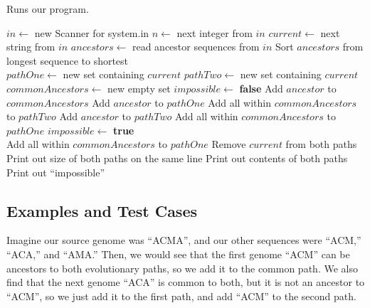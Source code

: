 \documentclass[12pt]{article}
\begin{document}
\begin{algorithm}[H]
\caption{Runs our program.}
\begin{algorithmic}
    \State $in \gets$ new Scanner for system.in
        \State $n \gets$ next integer from $in$
        \State $current \gets$ next string from $in$
        \State $ancestors \gets$ read ancestor sequences from $in$
        \State Sort $ancestors$ from longest sequence to shortest
        \\
        \State $pathOne \gets$ new set containing $current$
        \State $pathTwo \gets$ new set containing $current$
        \State $commonAncestors \gets$ new empty set
        \State $impossible \gets$ {\bf false}
                \State Add $ancestor$ to $commonAncestors$
                \State Add $ancestor$ to $pathOne$
                \State Add all within $commonAncestors$ to $pathTwo$
                \State Add $ancestor$ to $pathTwo$
                \State Add all within $commonAncestors$ to $pathOne$
            \Else
                \State $impossible \gets$ {\bf true}
            \EndIf
        \EndFor
        \\
            \State Add all within $commonAncestors$ to $pathOne$
            \State Remove $current$ from both paths
            \State Print out size of both paths on the same line
            \State Print out contents of both paths
        \Else
            \State Print out ``impossible''
        \EndIf
    \EndWhile
    \EndProcedure
\end{algorithmic}
\end{algorithm}

\subsection{Examples and Test Cases}

Imagine our source genome was ``ACMA'', and our
other sequences were ``ACM,'' ``ACA,'' and ``AMA.''
Then, we would see that the first genome ``ACM''
can be ancestors to both evolutionary paths, so
we add it to the common path. We also find that
the next genome ``ACA'' is common to both, but
it is not an ancestor to ``ACM'', so we just add
it to the first path, and add ``ACM'' to the second
path.
\end{document}
